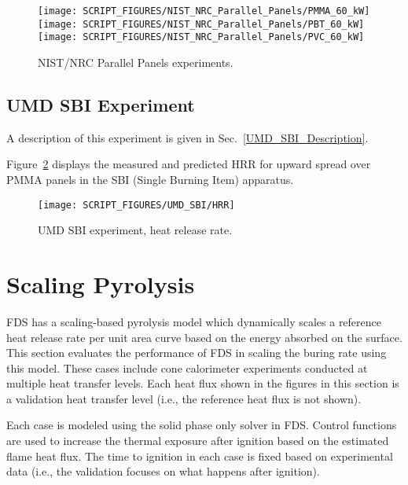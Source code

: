 \begin{figure}[!ht]
\centering
\texttt{[image: SCRIPT\_FIGURES/NIST\_NRC\_Parallel\_Panels/PMMA\_60\_kW]} \\
\texttt{[image: SCRIPT\_FIGURES/NIST\_NRC\_Parallel\_Panels/PBT\_60\_kW]} \\
\texttt{[image: SCRIPT\_FIGURES/NIST\_NRC\_Parallel\_Panels/PVC\_60\_kW]}
\caption[NIST/NRC Parallel Panels experiments]{NIST/NRC Parallel Panels experiments.}
\label{NIST_NRC_PP_HRR}
\end{figure}


\clearpage

\subsection{UMD SBI Experiment}

A description of this experiment is given in Sec.~\ref{UMD_SBI_Description}.

Figure~\ref{UMD_SBI_HRR} displays the measured and predicted HRR for upward spread over PMMA panels in the SBI (Single Burning Item) apparatus. 

\begin{figure}[!ht]
\centering
\texttt{[image: SCRIPT\_FIGURES/UMD\_SBI/HRR]}
\caption[UMD SBI experiment, heat release rate]{UMD SBI experiment, heat release rate.}
\label{UMD_SBI_HRR}
\end{figure}

\clearpage

\section{Scaling Pyrolysis}\label{sec_Scaling Pyrolysis}

FDS has a scaling-based pyrolysis model which dynamically scales a reference heat release rate per unit area curve based on the energy absorbed on the surface.
This section evaluates the performance of FDS in scaling the buring rate using this model.
These cases include cone calorimeter experiments conducted at multiple heat transfer levels. 
Each heat flux shown in the figures in this section is a validation heat transfer level (i.e., the reference heat flux is not shown).

Each case is modeled using the solid phase only solver in FDS.
Control functions are used to increase the thermal exposure after ignition based on the estimated flame heat flux.
The time to ignition in each case is fixed based on experimental data (i.e., the validation focuses on what happens after ignition).

